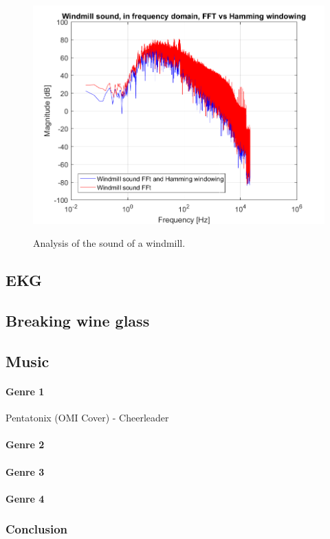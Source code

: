 \begin{figure}[htb]
	{\includegraphics[width=0.45\linewidth]{code/Windmill_figure5.png}}
	\caption{Analysis of the sound of a windmill.}\label{fig:windmill}
\end{figure}


\subsection{EKG}


\subsection{Breaking wine glass}


\subsection{Music}

\paragraph{Genre 1}
Pentatonix (OMI Cover) - Cheerleader

\paragraph{Genre 2}


\paragraph{Genre 3}

\paragraph{Genre 4}

\subsubsection{Conclusion}


